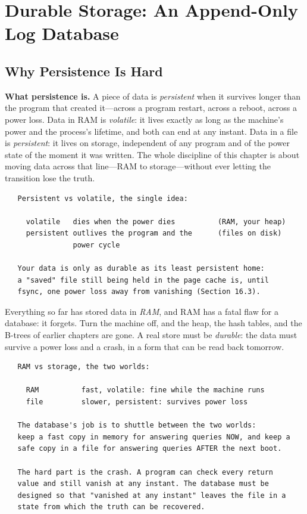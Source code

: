 
\chapter{Durable Storage: An Append-Only Log Database}

\section{Why Persistence Is Hard}

\textbf{What persistence is.} A piece of data is \emph{persistent} when
it survives longer than the program that created it---across a program
restart, across a reboot, across a power loss. Data in RAM is
\emph{volatile}: it lives exactly as long as the machine's power and
the process's lifetime, and both can end at any instant. Data in a
file is \emph{persistent}: it lives on storage, independent of any
program and of the power state of the moment it was written. The whole
discipline of this chapter is about moving data across that line---RAM
to storage---without ever letting the transition lose the truth.

\begin{verbatim}
   Persistent vs volatile, the single idea:

     volatile   dies when the power dies          (RAM, your heap)
     persistent outlives the program and the      (files on disk)
                power cycle

   Your data is only as durable as its least persistent home:
   a "saved" file still being held in the page cache is, until
   fsync, one power loss away from vanishing (Section 16.3).
\end{verbatim}

Everything so far has stored data in \emph{RAM}, and RAM has a fatal
flaw for a database: it forgets. Turn the machine off, and the heap,
the hash tables, and the B-trees of earlier chapters are gone. A real
store must be \emph{durable}: the data must survive a power loss and
a crash, in a form that can be read back tomorrow.

\begin{verbatim}
   RAM vs storage, the two worlds:

     RAM          fast, volatile: fine while the machine runs
     file         slower, persistent: survives power loss

   The database's job is to shuttle between the two worlds:
   keep a fast copy in memory for answering queries NOW, and keep a
   safe copy in a file for answering queries AFTER the next boot.

   The hard part is the crash. A program can check every return
   value and still vanish at any instant. The database must be
   designed so that "vanished at any instant" leaves the file in a
   state from which the truth can be recovered.
\end{verbatim}

